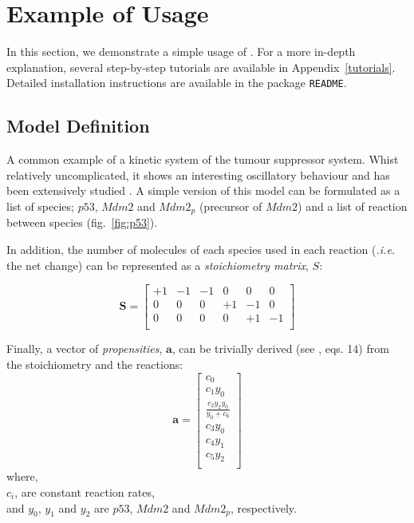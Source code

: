 \section{Example of Usage} \label{examples}
In this section, we demonstrate a simple usage of \means.
For a more in-depth explanation, several step-by-step tutorials are available in Appendix~\ref{tutorials}.
Detailed installation instructions are available in the package \texttt{README}.

\subsection{Model Definition}
A common example of a kinetic system of the \pft{} tumour suppressor system.
Whist relatively uncomplicated, it shows an interesting oscillatory behaviour and has been extensively studied \cite{geva-zatorsky_oscillations_2006, batchelor_ups_2009}.
A simple version of this model can be formulated as a list of species; $p53$, $Mdm2$ and $Mdm2_p$ (precursor of $Mdm2$) and a list of reaction between species (fig.~\ref{fig:p53}).

In addition, the number of molecules of each species used in each reaction (\emph{.i.e.} the net change) can be represented as a \emph{stoichiometry matrix}, $S$:

\[
\mathbf{S} =
\begin{bmatrix}
+1 & -1 & -1 & 0 & 0 & 0\\
0 & 0 & 0 & +1 & -1 & 0\\
0 & 0 & 0 & 0 & +1 & -1 \\
\end{bmatrix}
\]

Finally, a vector of \emph{propensities}, $\mathbf{a}$, can be trivially derived (see \cite{gillespie_general_1976}, eqs. 14) from the stoichiometry and the reactions:
\[
\mathbf{a} =
\begin{bmatrix}
c_0\\
c_1 y_0\\
\frac{c_2 y_2 y_0}{y_0+c_6}\\
c_3 y_0\\
c_4 y_1\\
c_5 y_2\\
\end{bmatrix}
\]
where,\\
$c_i$, are constant reaction rates,\\
and $y_0$, $y_1$ and $y_2$ are $p53$, $Mdm2$ and $Mdm2_p$, respectively.\\
   

